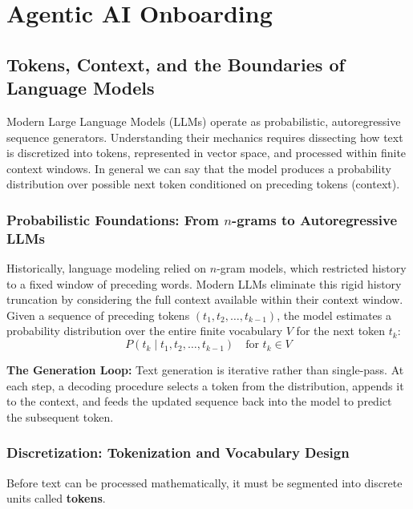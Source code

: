 \section{Agentic AI Onboarding}

\subsection{Tokens, Context, and the Boundaries of Language Models}

Modern Large Language Models (LLMs) operate as probabilistic, autoregressive sequence generators. Understanding their mechanics requires dissecting how text is discretized into tokens, represented in vector space, and processed within finite context windows. In general we can say that the model produces a probability distribution over possible next token conditioned on preceding tokens (context).

\subsubsection{Probabilistic Foundations: From $n$-grams to Autoregressive LLMs}

Historically, language modeling relied on $n$-gram models, which restricted history to a fixed window of preceding words.
\noindent
Modern LLMs eliminate this rigid history truncation by considering the full context available within their context window. Given a sequence of preceding tokens $(t_1, t_2, \dots, t_{k-1})$, the model estimates a probability distribution over the entire finite vocabulary $V$ for the next token $t_k$:
\[
P(t_k \mid t_1, t_2, \dots, t_{k-1}) \quad \text{for } t_k \in V
\]

\noindent
\textbf{The Generation Loop:} Text generation is iterative rather than single-pass. At each step, a decoding procedure selects a token from the distribution, appends it to the context, and feeds the updated sequence back into the model to predict the subsequent token.

\subsubsection{Discretization: Tokenization and Vocabulary Design}

Before text can be processed mathematically, it must be segmented into discrete units called \textbf{tokens}.

